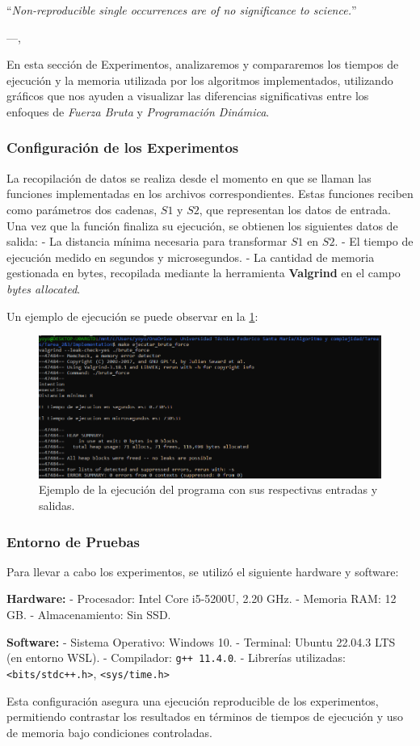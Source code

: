 \epigraph{``\textit{Non-reproducible single occurrences are of no significance to science.}''}{---\citeauthor{popper2005logic}, \citeyear{popper2005logic} \cite{popper2005logic}}

En esta sección de Experimentos, analizaremos y compararemos los tiempos de ejecución y la memoria utilizada por los algoritmos implementados, utilizando gráficos que nos ayuden a visualizar las diferencias significativas entre los enfoques de \textit{Fuerza Bruta} y \textit{Programación Dinámica}. 

\subsubsection{Configuración de los Experimentos}

La recopilación de datos se realiza desde el momento en que se llaman las funciones implementadas en los archivos correspondientes. Estas funciones reciben como parámetros dos cadenas, \( S1 \) y \( S2 \), que representan los datos de entrada. Una vez que la función finaliza su ejecución, se obtienen los siguientes datos de salida:
- La distancia mínima necesaria para transformar \( S1 \) en \( S2 \).
- El tiempo de ejecución medido en segundos y microsegundos.
- La cantidad de memoria gestionada en bytes, recopilada mediante la herramienta \textbf{Valgrind} en el campo \textit{bytes allocated}.

Un ejemplo de ejecución se puede observar en la \cref{fig:ejemplo-ejecución}:

\begin{figure}[H]
    \centering
    \includegraphics[width=0.75\linewidth]{Tarea_2&3//images/ejemplo_ejecucion.png}
    \caption{Ejemplo de la ejecución del programa con sus respectivas entradas y salidas.}
    \label{fig:ejemplo-ejecución}
\end{figure}

\subsubsection{Entorno de Pruebas}

Para llevar a cabo los experimentos, se utilizó el siguiente hardware y software:

\textbf{Hardware:}
  - Procesador: Intel Core i5-5200U, 2.20 GHz.
  - Memoria RAM: 12 GB.
  - Almacenamiento: Sin SSD.

\textbf{Software:}
  - Sistema Operativo: Windows 10.
  - Terminal: Ubuntu 22.04.3 LTS (en entorno WSL).
  - Compilador: \texttt{g++ 11.4.0}.
  - Librerías utilizadas:
    \texttt{<bits/stdc++.h>}, \texttt{<sys/time.h>}

Esta configuración asegura una ejecución reproducible de los experimentos, permitiendo contrastar los resultados en términos de tiempos de ejecución y uso de memoria bajo condiciones controladas.